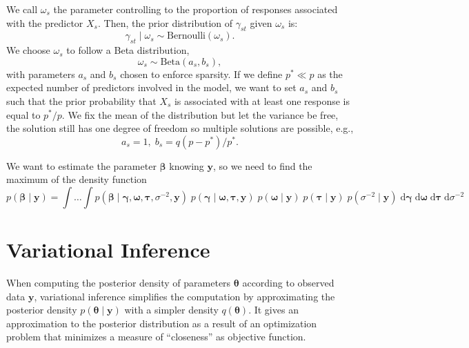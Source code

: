 \documentclass[a4paper, 11pt]{report}
\numberwithin{equation}{chapter}
\begin{document}
We call $\omega_s$ the parameter controlling to the proportion of responses associated with the predictor $X_s$. Then, the prior distribution of $\gamma_{st}$ given $\omega_s$ is:
\begin{equation*}
\gamma_{st} \mid \omega_s \sim  \text{Bernoulli}(\omega_s).
\end{equation*}
We choose $\omega_s$ to follow a Beta distribution,
\begin{equation*}
\omega_s \sim \text{Beta}(a_s, b_s),
\end{equation*}
with parameters $a_s$ and $b_s$ chosen to enforce sparsity. If we define $p^* \ll p$ as the expected number of predictors involved in the model, we want to set $a_s$ and $b_s$ such that the prior probability that $X_s$ is associated with at least one response is equal to $p^*/p$. We fix the mean of the distribution but let the variance be free, the solution still has one degree of freedom so multiple solutions are possible, e.g.,
\begin{equation*}
a_s = 1,\;b_s = q(p-p^*)/p^*.
\end{equation*}

We want to estimate the parameter $\boldsymbol{\beta}$ knowing $\boldsymbol{y}$, so we need to find the maximum of the density function
\begin{equation*}
p(\boldsymbol{\beta}\mid\boldsymbol{y})=\int\dots\int p(\boldsymbol{\beta}\mid\boldsymbol{\gamma},\boldsymbol{\omega},\boldsymbol{\tau},\sigma^{-2},\boldsymbol{y})\;p(\boldsymbol{\gamma}\mid \boldsymbol{\omega},\boldsymbol{\tau},\boldsymbol{y})\;p(\boldsymbol{\omega}\mid\boldsymbol{y})\;p(\boldsymbol{\tau}\mid\boldsymbol{y})\;p(\sigma^{-2}\mid\boldsymbol{y})\;\mathrm{d}\boldsymbol{\gamma}\;\mathrm{d}\boldsymbol{\omega}\;\mathrm{d}\boldsymbol{\tau}\;\mathrm{d}\sigma^{-2}
\end{equation*}
\newpage
\chapter{Variational Inference}
When computing the posterior density of parameters $\boldsymbol{\theta}$ according to observed data $\boldsymbol{y}$, variational inference simplifies the computation by approximating the posterior density $p(\boldsymbol{\theta}\mid \boldsymbol{y})$ with a simpler density $q(\boldsymbol{\theta})$. It gives an approximation to the posterior distribution as a result of an optimization problem that minimizes a measure of ``closeness'' as objective function.
\end{document}
